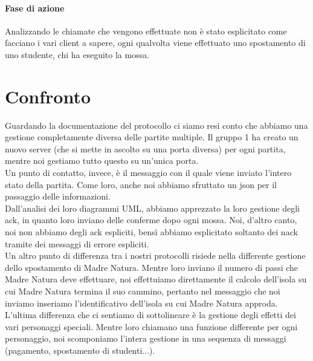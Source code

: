 \documentclass[a4paper]{article}
\begin{document}
	\paragraph{Fase di azione} Analizzando le chiamate che vengono effettuate non è stato esplicitato come facciano i vari client a sapere, ogni qualvolta viene effettuato uno spostamento di uno studente, chi ha eseguito la mossa.
	
	\section{Confronto}
	
	
	Guardando la documentazione del protocollo ci siamo resi conto che abbiamo una gestione completamente diversa delle partite multiple. Il gruppo 1 ha creato un nuovo server (che si mette in ascolto su una porta diversa) per ogni partita, mentre noi gestiamo tutto questo su un'unica porta. \\
	
	Un punto di contatto, invece, è il messaggio con il quale viene inviato l'intero stato della partita. Come loro, anche noi abbiamo sfruttato un json per il passaggio delle informazioni. \\
	
	Dall'analisi dei loro diagrammi UML, abbiamo apprezzato la loro gestione degli ack, in quanto loro inviano delle conferme dopo ogni mossa. Noi, d'altro canto, noi non abbiamo degli ack espliciti, bensì abbiamo esplicitato soltanto dei nack tramite dei messaggi di errore espliciti. \\
	
	Un altro punto di differenza tra i nostri protocolli risiede nella differente gestione dello spostamento di Madre Natura. Mentre loro inviano il numero di passi che Madre Natura deve effettuare, noi effettuiamo direttamente il calcolo dell'isola su cui Madre Natura termina il suo cammino, pertanto nel messaggio che noi inviamo inseriamo l'identificativo dell'isola su cui Madre Natura approda. \\
	
	L'ultima differenza che ci sentiamo di sottolineare è la gestione degli effetti dei vari personaggi speciali. Mentre loro chiamano una funzione differente per ogni personaggio, noi scomponiamo l'intera gestione in una sequenza di messaggi (pagamento, spostamento di studenti...).
\end{document}

